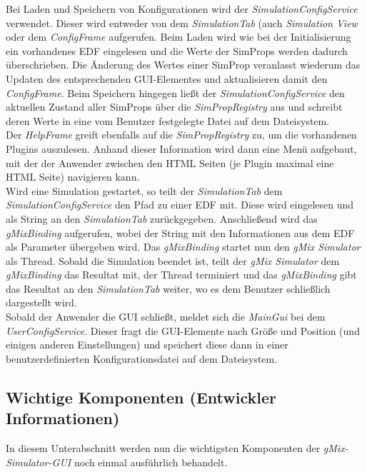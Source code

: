 \documentclass[a4paper, 11pt]{article} %
\begin{document}
Bei Laden und Speichern von Konfigurationen wird der \emph{SimulationConfigService} verwendet. Dieser wird entweder von dem \emph{SimulationTab} (auch \emph{Simulation View} oder dem \emph{ConfigFrame} aufgerufen. Beim Laden wird wie bei der Initialisierung ein vorhandenes EDF eingelesen und die Werte der SimProps werden dadurch überschrieben. Die Änderung des Wertes einer SimProp veranlasst wiederum das Updaten des entsprechenden GUI-Elementes und aktualisieren damit den \emph{ConfigFrame}. Beim Speichern hingegen ließt der \emph{SimulationConfigService} den aktuellen Zustand aller SimProps über die \emph{SimPropRegistry} aus und schreibt deren Werte in eine vom Benutzer festgelegte Datei auf dem Dateisystem.\\

Der \emph{HelpFrame} greift ebenfalls auf die \emph{SimPropRegistry} zu, um die vorhandenen Plugins auszulesen. Anhand dieser Information wird dann eine Menü aufgebaut, mit der der Anwender zwischen den HTML Seiten (je Plugin maximal eine HTML Seite) navigieren kann.\\

Wird eine Simulation gestartet, so teilt der \emph{SimulationTab} dem \emph{SimulationConfigService} den Pfad zu einer EDF mit. Diese wird eingelesen und als String an den \emph{SimulationTab} zurückgegeben. Anschließend wird das \emph{gMixBinding} aufgerufen, wobei der String mit den Informationen aus dem EDF als Parameter übergeben wird. Das \emph{gMixBinding} startet nun den \emph{gMix Simulator} als Thread. Sobald die Simulation beendet ist, teilt der \emph{gMix Simulator} dem \emph{gMixBinding} das Resultat mit, der Thread terminiert und das \emph{gMixBinding} gibt das Resultat an den \emph{SimulationTab} weiter, wo es dem Benutzer schließlich dargestellt wird.\\

Sobald der Anwender die GUI schließt, meldet sich die \emph{MainGui} bei dem \emph{UserConfigService}. Dieser fragt die GUI-Elemente nach Größe und Position (und einigen anderen Einstellungen) und speichert diese dann in einer benutzerdefinierten Konfigurationsdatei auf dem Dateisystem.


\subsection{Wichtige Komponenten (Entwickler Informationen)} %
\label{ssub:einzelne_komponenten}
In diesem Unterabschnitt werden nun die wichtigsten Komponenten der \emph{gMix-Simulator-GUI} noch einmal ausführlich behandelt.
\end{document}
